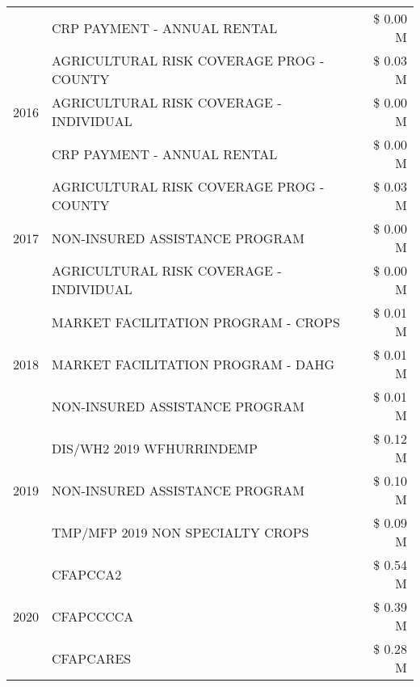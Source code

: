 \begin{tabular}{llr}
 & CRP PAYMENT - ANNUAL RENTAL & \$ 0.00 M \\
\cline{1-3}
\multirow[t]{3}{*}{2016} & AGRICULTURAL RISK COVERAGE PROG - COUNTY & \$ 0.03 M \\
 & AGRICULTURAL RISK COVERAGE - INDIVIDUAL & \$ 0.00 M \\
 & CRP PAYMENT - ANNUAL RENTAL & \$ 0.00 M \\
\cline{1-3}
\multirow[t]{3}{*}{2017} & AGRICULTURAL RISK COVERAGE PROG - COUNTY & \$ 0.03 M \\
 & NON-INSURED ASSISTANCE PROGRAM & \$ 0.00 M \\
 & AGRICULTURAL RISK COVERAGE - INDIVIDUAL & \$ 0.00 M \\
\cline{1-3}
\multirow[t]{3}{*}{2018} & MARKET FACILITATION PROGRAM - CROPS & \$ 0.01 M \\
 & MARKET FACILITATION PROGRAM - DAHG & \$ 0.01 M \\
 & NON-INSURED ASSISTANCE PROGRAM & \$ 0.01 M \\
\cline{1-3}
\multirow[t]{3}{*}{2019} & DIS/WH2 2019 WFHURRINDEMP & \$ 0.12 M \\
 & NON-INSURED ASSISTANCE PROGRAM & \$ 0.10 M \\
 & TMP/MFP 2019 NON SPECIALTY CROPS & \$ 0.09 M \\
\cline{1-3}
\multirow[t]{3}{*}{2020} & CFAPCCA2 & \$ 0.54 M \\
 & CFAPCCCCA & \$ 0.39 M \\
 & CFAPCARES & \$ 0.28 M \\
\cline{1-3}
\bottomrule
\end{tabular}
